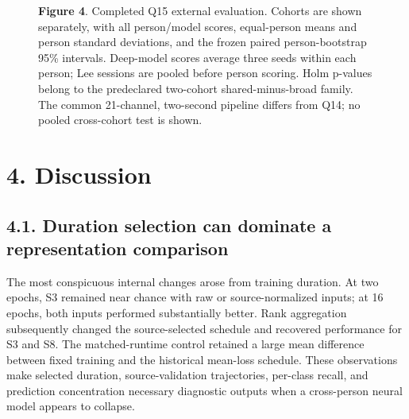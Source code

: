 \documentclass[11pt]{article}
\begin{document}
\begin{figure}[htbp]
{
}
\caption*{\textbf{Figure 4}. Completed Q15 external evaluation. Cohorts are shown separately, with all person/model scores, equal-person means and person standard deviations, and the frozen paired person-bootstrap 95\% intervals. Deep-model scores average three seeds within each person; Lee sessions are pooled before person scoring. Holm p-values belong to the predeclared two-cohort shared-minus-broad family. The common 21-channel, two-second pipeline differs from Q14; no pooled cross-cohort test is shown.}
\end{figure}
\section*{4. Discussion}
\subsection*{4.1. Duration selection can dominate a representation comparison}
The most conspicuous internal changes arose from training duration. At two epochs, S3 remained near chance with raw or source-normalized inputs; at 16 epochs, both inputs performed substantially better. Rank aggregation subsequently changed the source-selected schedule and recovered performance for S3 and S8. The matched-runtime control retained a large mean difference between fixed training and the historical mean-loss schedule. These observations make selected duration, source-validation trajectories, per-class recall, and prediction concentration necessary diagnostic outputs when a cross-person neural model appears to collapse.
\end{document}
